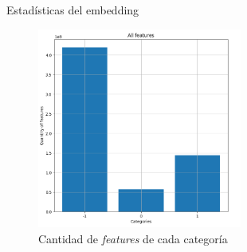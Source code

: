 \documentclass{beamer}
\begin{document}
\begin{frame}{Estadísticas del embedding}

\begin{figure}[h] 
	\centering
	\includegraphics[width=0.6\textwidth] {Images/plots/25/quantity_of_features_bar.png}
	\caption{ Cantidad de \textit{features} de cada categoría
	\label{fig:totalfeatures}}
\end{figure}
\end{frame}
\end{document}
